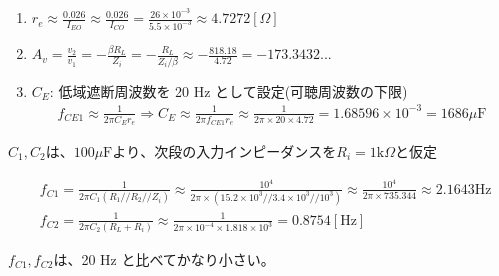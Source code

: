 \begin{enumerate}
  \setlength{\parskip}{0cm}
  \setlength{\itemsep}{0cm}
  \item $r_e \approx \frac{0.026}{I_{EO}} \approx \frac{0.026}{I_{CO}} = \frac{26\times10^{-3}}{5.5 \times 10^{-3}} \approx 4.7272 [\Omega]$
  \item $A_v = \frac{v_2}{v_1} = -\frac{\beta R_L}{Z_i} = -\frac{R_L}{Z_i/\beta} \approx -\frac{818.18}{4.72} = -173.3432...$
  \item $C_E$: 低域遮断周波数を 20 Hz として設定(可聴周波数の下限)
  \begin{align}
    f_{CE1} \approx \frac{1}{2\pi C_Er_e} \Rightarrow C_E \approx \frac{1}{2\pi f_{CE1} r_e} \approx \frac{1}{2\pi \times 20 \times 4.72} = 1.68596 \times 10^{-3} = 1686 \mu\textrm{F}
  \end{align}
\end{enumerate}
$C_1, C_2は、100 \mu\textrm{F} より、次段の入力インピーダンスを R_i = 1\textrm{k}\Omega と仮定$

\begin{align}
  & f_{C1} = \frac{1}{2\pi C_1(R_1//R_2//Z_i)} \approx \frac{10^4}{2\pi \times (15.2\times10^3//3.4\times10^3//10^3)} \approx \frac{10^4}{2\pi \times 735.344} \approx 2.1643\textrm{Hz}\\
  & f_{C2} = \frac{1}{2\pi C_2(R_L+R_i)} \approx \frac{1}{2\pi \times 10^{-4} \times 1.818 \times 10^3} = 0.8754[\textrm{Hz}]  
\end{align}

$f_{C1}, f_{C2}$は、20 Hz と比べてかなり小さい。